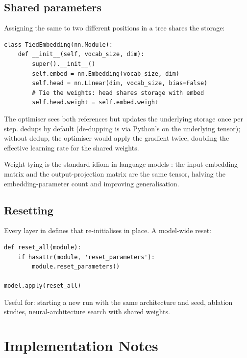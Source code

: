 \subsection{Shared parameters}
\label{ssec:module_system:shared_params}

Assigning the same  to two different positions
in a tree shares the storage:

\begin{lstlisting}[style=lucid,language=LucidPython]
class TiedEmbedding(nn.Module):
    def __init__(self, vocab_size, dim):
        super().__init__()
        self.embed = nn.Embedding(vocab_size, dim)
        self.head = nn.Linear(dim, vocab_size, bias=False)
        # Tie the weights: head shares storage with embed
        self.head.weight = self.embed.weight
\end{lstlisting}

The optimiser sees both references but updates the underlying
storage once per step.  dedups by
default (de-dupping is via Python's  on the underlying
tensor); without dedup, the optimiser would apply the gradient
twice, doubling the effective learning rate for the shared
weights.

Weight tying is the standard idiom in language models
\cite{radford_gpt2_2019}: the input-embedding matrix and the
output-projection matrix are the same tensor, halving the
embedding-parameter count and improving generalisation.

\subsection{Resetting}
\label{ssec:module_system:resetting}

Every layer in  defines 
that re-initialises in place. A model-wide reset:

\begin{lstlisting}[style=lucid,language=LucidPython]
def reset_all(module):
    if hasattr(module, 'reset_parameters'):
        module.reset_parameters()

model.apply(reset_all)
\end{lstlisting}

Useful for: starting a new run with the same architecture and
seed, ablation studies, neural-architecture search with shared
weights.

\section{Implementation Notes}
\label{sec:module_system:impl_notes}

